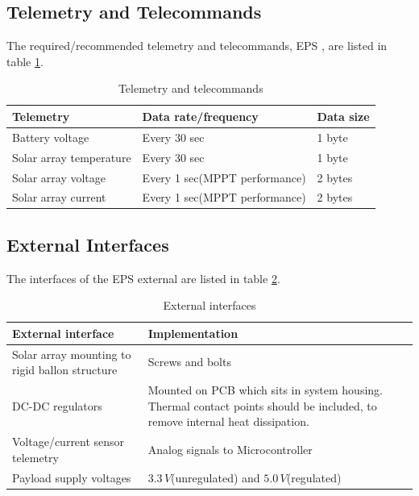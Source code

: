\subsection{Telemetry and Telecommands}
%
The required/recommended telemetry and telecommands, \ac{EPS} , are listed in table \ref{tab:Telemetry_Telecommands}.
%
\begin{table}[H]
\centering
\caption{Telemetry and telecommands}
\label{tab:Telemetry_Telecommands}
\begin{tabular}{|l|l|l|}
\hline
\textbf{Telemetry} & \textbf{Data rate/frequency} & \textbf{Data size} \\
\hline
Battery voltage & Every 30 sec & 1 byte \\
\hline
Solar array temperature & Every 30 sec & 1 byte\\
\hline
Solar array voltage & Every 1 sec(MPPT performance) & 2 bytes\\
\hline
Solar array current & Every 1 sec(MPPT performance) & 2 bytes\\
\hline%
\end{tabular}
\end{table}
%
\subsection{External Interfaces}
%
The interfaces of the \ac{EPS} external are listed in table \ref{tab:external_interfaces}.
%
\begin{table}[H]
\centering
\caption{External interfaces}
\label{tab:external_interfaces}
\begin{tabular}{m{}m{}}
\hline
\textbf{External interface} & \textbf{Implementation}\\
\hline
Solar array mounting to rigid ballon structure & Screws and bolts\\[2mm]
DC-DC regulators & Mounted on PCB which sits in system housing. Thermal contact points should be included, to remove internal heat dissipation.\\[2mm]
Voltage/current sensor telemetry & Analog signals to Microcontroller\\[2mm]
Payload supply voltages & $3.3\,V$(unregulated) and $5.0\,V$(regulated)\\[2mm]
\hline
\end{tabular}
\end{table}